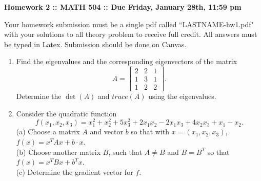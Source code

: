 \documentclass[12pt]{article}
\begin{document}
\vspace{.2 cm}

\begin{center}
{ \bf Homework 2 :: MATH 504 ::  Due Friday, January 28th, 11:59 pm} \\[.2in]
\end{center}
Your homework submission must be a single pdf called ``LASTNAME-hw1.pdf" 
with your solutions to all theory problem to receive full credit. All answers must be typed in Latex.
Submission should be done on Canvas.


\begin{enumerate}

 \item Find the eigenvalues and the corresponding eigenvectors of the matrix
\[
A=
\left[
\begin{array}{ccc}
2 & 2 &1\\
1&3&1\\
1&2&2
\end{array}
\right].
\]
Determine the $\det(A)$ and $trace(A)$ using the eigenvalues.


\item  Consider the quadratic function
\[
f(x_1,x_2,x_3)=x_1^2+x_2^2+5x_3^2+2x_1x_2 -2x_1x_3+4x_2x_3+x_1-x_2.
\]
(a) Choose a matrix $A$ and vector $b$ so that with $x = (x_1, x_2,x_3)$, $f(x) = x^TAx + b \cdot x$.  
\\
(b) Choose another matrix $B$, such that $A \neq B$ and $B=B^T$ so that $f(x) = x^TBx + b^Tx$. \\
(c) Determine the gradient vector for $f$.
\end{enumerate}
\end{document}
